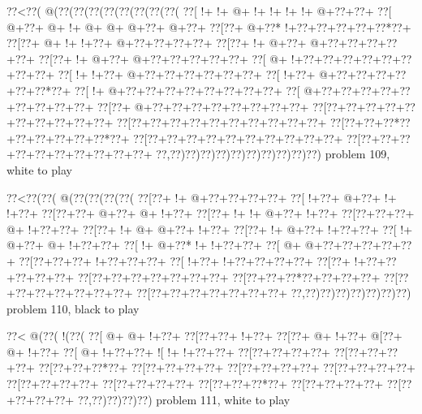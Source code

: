 \vbox{\vbox{\goo
\0??<\0??(\- @(\0??(\0??(\0??(\0??(\0??(\0??(\0??(\0??(
\0??[\- !+\- !+\- @+\- !+\- !+\- !+\- !+\- @+\0??+\0??+
\0??[\- @+\0??+\- @+\- !+\- @+\- @+\- @+\0??+\- @+\0??+
\0??[\0??+\- @+\0??*\- !+\0??+\0??+\0??+\0??+\0??*\0??+
\0??[\0??+\- @+\- !+\- !+\0??+\- @+\0??+\0??+\0??+\0??+
\0??[\0??+\- !+\- @+\0??+\- @+\0??+\0??+\0??+\0??+\0??+
\0??[\0??+\- !+\- @+\0??+\- @+\0??+\0??+\0??+\0??+\0??+
\0??[\- @+\- !+\0??+\0??+\0??+\0??+\0??+\0??+\0??+\0??+
\0??[\- !+\- !+\0??+\- @+\0??+\0??+\0??+\0??+\0??+\0??+
\0??[\- !+\0??+\- @+\0??+\0??+\0??+\0??+\0??+\0??*\0??+
\0??[\- !+\- @+\0??+\0??+\0??+\0??+\0??+\0??+\0??+\0??+
\0??[\- @+\0??+\0??+\0??+\0??+\0??+\0??+\0??+\0??+\0??+
\0??[\0??+\- @+\0??+\0??+\0??+\0??+\0??+\0??+\0??+\0??+
\0??[\0??+\0??+\0??+\0??+\0??+\0??+\0??+\0??+\0??+\0??+
\0??[\0??+\0??+\0??+\0??+\0??+\0??+\0??+\0??+\0??+\0??+
\0??[\0??+\0??+\0??*\0??+\0??+\0??+\0??+\0??+\0??*\0??+
\0??[\0??+\0??+\0??+\0??+\0??+\0??+\0??+\0??+\0??+\0??+
\0??[\0??+\0??+\0??+\0??+\0??+\0??+\0??+\0??+\0??+\0??+
\0??,\0??)\0??)\0??)\0??)\0??)\0??)\0??)\0??)\0??)\0??)
}
\hfil problem 109, white to play\hfil\break
}

\vbox{\vbox{\goo
\0??<\0??(\0??(\- @(\0??(\0??(\0??(\0??(
\0??[\0??+\- !+\- @+\0??+\0??+\0??+\0??+
\0??[\- !+\0??+\- @+\0??+\- !+\- !+\0??+
\0??[\0??+\0??+\- @+\0??+\- @+\- !+\0??+
\0??[\0??+\- !+\- !+\- @+\0??+\- !+\0??+
\0??[\0??+\0??+\0??+\- @+\- !+\0??+\0??+
\0??[\0??+\- !+\- @+\- @+\0??+\- !+\0??+
\0??[\0??+\- !+\- @+\0??+\- !+\0??+\0??+
\0??[\- !+\- @+\0??+\- @+\- !+\0??+\0??+
\0??[\- !+\- @+\0??*\- !+\- !+\0??+\0??+
\0??[\- @+\- @+\0??+\0??+\0??+\0??+\0??+
\0??[\0??+\0??+\0??+\- !+\0??+\0??+\0??+
\0??[\- !+\0??+\- !+\0??+\0??+\0??+\0??+
\0??[\0??+\- !+\0??+\0??+\0??+\0??+\0??+
\0??[\0??+\0??+\0??+\0??+\0??+\0??+\0??+
\0??[\0??+\0??+\0??*\0??+\0??+\0??+\0??+
\0??[\0??+\0??+\0??+\0??+\0??+\0??+\0??+
\0??[\0??+\0??+\0??+\0??+\0??+\0??+\0??+
\0??,\0??)\0??)\0??)\0??)\0??)\0??)\0??)
}
\hfil problem 110, black to play\hfil\break
}

\vbox{\vbox{\goo
\0??<\- @(\0??(\- !(\0??(
\0??[\- @+\- @+\- !+\0??+
\0??[\0??+\0??+\- !+\0??+
\0??[\0??+\- @+\- !+\0??+
\- @[\0??+\- @+\- !+\0??+
\0??[\- @+\- !+\0??+\0??+
\- ![\- !+\- !+\0??+\0??+
\0??[\0??+\0??+\0??+\0??+
\0??[\0??+\0??+\0??+\0??+
\0??[\0??+\0??+\0??*\0??+
\0??[\0??+\0??+\0??+\0??+
\0??[\0??+\0??+\0??+\0??+
\0??[\0??+\0??+\0??+\0??+
\0??[\0??+\0??+\0??+\0??+
\0??[\0??+\0??+\0??+\0??+
\0??[\0??+\0??+\0??*\0??+
\0??[\0??+\0??+\0??+\0??+
\0??[\0??+\0??+\0??+\0??+
\0??,\0??)\0??)\0??)\0??)
}
\hfil problem 111, white to play\hfil\break
}

